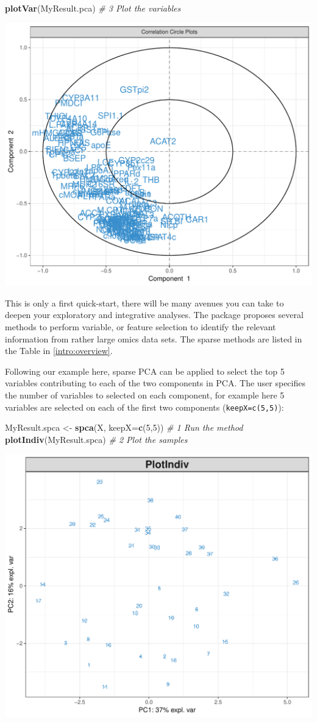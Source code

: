 \documentclass[]{book}
\newenvironment{Shaded}{\begin{snugshade}}{\end{snugshade}}
\newcommand{\CommentTok}[1]{\textcolor[rgb]{0.56,0.35,0.01}{\textit{#1}}}
\newcommand{\DataTypeTok}[1]{\textcolor[rgb]{0.13,0.29,0.53}{#1}}
\newcommand{\DecValTok}[1]{\textcolor[rgb]{0.00,0.00,0.81}{#1}}
\newcommand{\KeywordTok}[1]{\textcolor[rgb]{0.13,0.29,0.53}{\textbf{#1}}}
\newcommand{\NormalTok}[1]{#1}
\newcommand{\StringTok}[1]{\textcolor[rgb]{0.31,0.60,0.02}{#1}}
\begin{document}
\begin{Shaded}
\begin{Highlighting}[]
\KeywordTok{plotVar}\NormalTok{(MyResult.pca)   }\CommentTok{# 3 Plot the variables}
\end{Highlighting}
\end{Shaded}

\begin{center}\includegraphics[width=0.5\linewidth,]{Figures/02-pca-nutrimouse-2} \end{center}

This is only a first quick-start, there will be many avenues you can take to deepen your exploratory and integrative analyses. The package proposes several methods to perform variable, or feature selection to identify the relevant information from rather large omics data sets. The sparse methods are listed in the Table in \ref{intro:overview}.

Following our example here, sparse PCA can be applied to select the top 5 variables contributing to each of the two components in PCA. The user specifies the number of variables to selected on each component, for example here 5 variables are selected on each of the first two components (\texttt{keepX=c(5,5)}):

\begin{Shaded}
\begin{Highlighting}[]
\NormalTok{MyResult.spca <-}\StringTok{ }\KeywordTok{spca}\NormalTok{(X, }\DataTypeTok{keepX=}\KeywordTok{c}\NormalTok{(}\DecValTok{5}\NormalTok{,}\DecValTok{5}\NormalTok{)) }\CommentTok{# 1 Run the method}
\KeywordTok{plotIndiv}\NormalTok{(MyResult.spca)               }\CommentTok{# 2 Plot the samples}
\end{Highlighting}
\end{Shaded}

\begin{center}\includegraphics[width=0.5\linewidth,]{Figures/02-spca-nutrimouse-1} \end{center}
\end{document}
